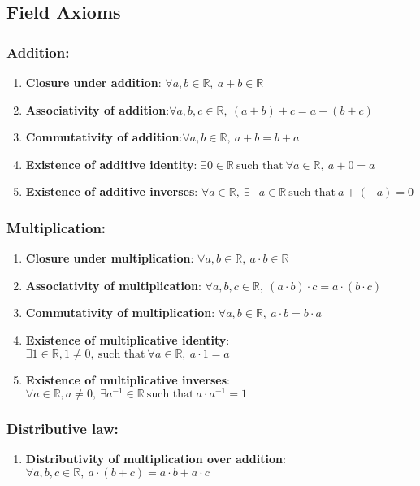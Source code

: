 \documentclass[11pt,openany]{article}
\begin{document}
\subsection{Field Axioms}

\subsubsection*{Addition:}
\begin{enumerate}
	\item \textbf{Closure under addition}: $\forall a, b \in \mathbb{R}, \ a + b \in \mathbb{R}$
	\item \textbf{Associativity of addition}:$\forall a, b, c \in \mathbb{R}, \ (a + b) + c = a + (b + c)$
	\item \textbf{Commutativity of addition}:$\forall a, b \in \mathbb{R}, \ a + b = b + a$
	\item \textbf{Existence of additive identity}: $
	\exists 0 \in \mathbb{R} \ \text{such that} \ \forall a \in \mathbb{R}, \ a + 0 = a$
	\item \textbf{Existence of additive inverses}: $
	\forall a \in \mathbb{R}, \ \exists -a \in \mathbb{R} \ \text{such that} \ a + (-a) = 0$
\end{enumerate}
\subsubsection*{Multiplication:}
\begin{enumerate}
	\item \textbf{Closure under multiplication}: $\forall a, b \in \mathbb{R}, \ a \cdot b \in \mathbb{R}$
	\item \textbf{Associativity of multiplication}: $
	\forall a, b, c \in \mathbb{R}, \ (a \cdot b) \cdot c = a \cdot (b \cdot c)$
	\item \textbf{Commutativity of multiplication}: $
	\forall a, b \in \mathbb{R}, \ a \cdot b = b \cdot a$
	\item \textbf{Existence of multiplicative identity}: $
	\exists 1 \in \mathbb{R}, 1 \neq 0, \ \text{such that} \ \forall a \in \mathbb{R}, \ a \cdot 1 = a$
	\item \textbf{Existence of multiplicative inverses}: $
	\forall a \in \mathbb{R}, a \neq 0, \ \exists a^{-1} \in \mathbb{R} \ \text{such that} \ a \cdot a^{-1} = 1$
\end{enumerate}
\subsubsection*{Distributive law:}
\begin{enumerate}
	\item \textbf{Distributivity of multiplication over addition}: $
	\forall a, b, c \in \mathbb{R}, \ a \cdot (b + c) = a \cdot b + a \cdot c$
\end{enumerate}
\vspace{20pt}
\end{document}
